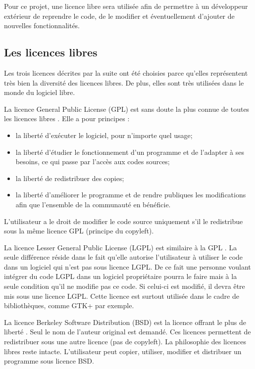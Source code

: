	Pour ce projet, une licence libre sera utilisée afin de permettre à un développeur extérieur de reprendre le code, de le modifier et éventuellement d'ajouter de nouvelles fonctionnalités.     


	\subsection{Les licences libres}
		Les trois licences décrites par la suite ont été choisies parce qu'elles représentent très bien la diversité des licences libres. De plus, elles sont très utilisées dans le monde du logiciel libre.

		La licence General Public License (GPL) est sans doute la plus connue de toutes les licences libres \cite{website:licenceGPL}. Elle a pour principes :
		\begin{itemize}
			\item la liberté d'exécuter le logiciel, pour n'importe quel usage; 
			\item la liberté d'étudier le fonctionnement d'un programme et de l'adapter à ses besoins, ce qui passe par l'accès aux codes sources;
			\item la liberté de redistribuer des copies;
			\item la liberté d'améliorer le programme et de rendre publiques les modifications afin que l'ensemble de la communauté en bénéficie.
		\end{itemize}

	L'utilisateur a le droit de modifier le code source uniquement s'il le redistribue sous la même licence GPL (principe du copyleft).

		La licence Lesser General Public License (LGPL) est similaire à la GPL \cite{website:licenceLGPL}. La seule différence réside dans le fait qu'elle autorise l'utilisateur à utiliser le code dans un logiciel qui n'est pas sous licence LGPL. De ce fait une personne voulant intégrer du code LGPL dans un logiciel propriétaire pourra le faire mais à la seule condition qu'il ne modifie pas ce code. Si celui-ci est modifié, il devra être mis sous une licence LGPL. Cette licence est surtout utilisée dans le cadre de bibliothèques, comme GTK+ par exemple.

		La licence Berkeley Software Distribution (BSD) est la licence offrant le plus de liberté \cite{website:licenceBSD}. Seul le nom de l'auteur original est demandé. Ces licences permettent de redistribuer sous une autre licence (pas de copyleft). La philosophie des licences libres reste intacte. L'utilisateur peut copier, utiliser, modifier et distribuer un programme sous licence BSD.


